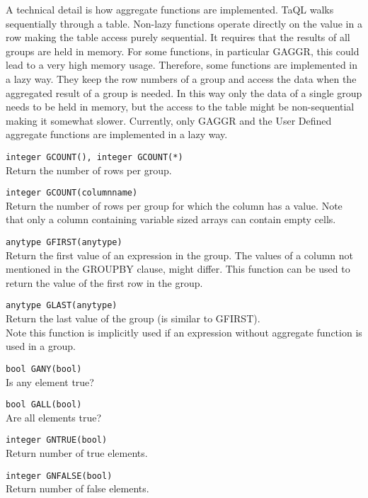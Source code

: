 A technical detail is how aggregate functions are
implemented. TaQL walks sequentially through a table. Non-lazy
functions operate directly on the value in a row making the table
access purely sequential. It requires that the results of all groups
are held in memory. For some functions, in particular GAGGR, this
could lead to a very high memory usage. Therefore, some functions are
implemented in a lazy way. They 
keep the row numbers of a group and access the data when the
aggregated result of a group is needed. In this way only the data of a
single group needs to be held in memory, but the access to the table
might be non-sequential making it somewhat slower.
Currently, only GAGGR and the User Defined aggregate functions are
implemented in a lazy way. 

\begin{description}
  \item[] \texttt{integer GCOUNT(), integer GCOUNT(*)}\\
    Return the number of rows per group.
  \item[] \texttt{integer GCOUNT(columnname)}\\
    Return the number of rows per group for which the column has a
    value. Note that only a column containing variable sized arrays can
    contain empty cells.
  \item \texttt{anytype GFIRST(anytype)}\\
      Return the first value of an expression in the group. The values
      of a column not mentioned in the GROUPBY clause, might
      differ. This function can be used to return the value of the
      first row in the group.
  \item \texttt{anytype GLAST(anytype)}\\
      Return the last value of the group (is similar to GFIRST).
      \\Note this function is implicitly used if an expression without
      aggregate function is used in a group.
  \item[] \texttt{bool GANY(bool)}\\
    Is any element true?
  \item[] \texttt{bool GALL(bool)}\\
    Are all elements true?
  \item[] \texttt{integer GNTRUE(bool)}\\
    Return number of true elements.
  \item[] \texttt{integer GNFALSE(bool)}\\
    Return number of false elements.

\end{description}
